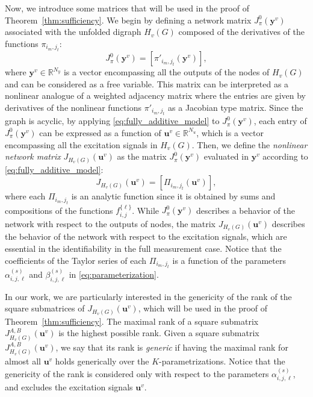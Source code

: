 \documentclass[letterpaper,10pt,journal]{IEEEtran}
\newcommand{\y}{\mathbf{y}}
\newcommand{\uu}{\mathbf{u}}
\newcommand{\R}{\mathbb R}
\begin{document}
Now, we introduce some matrices that will be used in the proof of Theorem~\ref{thm:sufficiency}. We begin by defining a network matrix $J_\pi^0(\y^v)$ associated with the unfolded digraph $H_v(G)$ composed of the derivatives of the functions $\pi_{i_m,j_t}$:
\begin{equation}\label{eq:matrix_J_0}
J_\pi^0(\y^v)=
[\pi'_{i_m,j_t}(\y^v)],
\end{equation}
where $\y^v\in\R^{N_y}$ is a vector encompassing all the outputs of the nodes of $H_v(G)$ and can be considered as a free variable. This matrix can be interpreted as a nonlinear analogue of a weighted adjacency matrix where the entries are given by derivatives of the nonlinear functions $\pi'_{i_m,j_t}$ as a Jacobian type matrix.
Since the graph is acyclic, by applying \eqref{eq:fully_additive_model} to $J_\pi^0(\y^v)$, each entry of $J_\pi^0(\y^v)$ can be expressed as a function of $\uu^v\in \R^{N_u}$, which is a vector encompassing all the excitation signals in $H_v(G)$. Then, we define the \emph{nonlinear network matrix} $J_{H_v(G)}(\uu^v)$ as the matrix $J_\pi^0(\y^v)$ evaluated in $\y^v$ according to \eqref{eq:fully_additive_model}:
\begin{equation}\label{eq:matrix_J_G}
J_{H_v(G)}(\uu^v)=[\Pi_{i_m,j_t}(\uu^v)],    
\end{equation}
where each $\Pi_{i_m,j_t}$ is an analytic function since it is obtained by sums and compositions of the functions $f_{i,j}^{\{\ell\}}$. While $J_\pi^0(\y^v)$ describes a behavior of the network with respect to the outputs of nodes, the matrix $J_{H_v(G)}(\uu^v)$ describes the behavior of the network with respect to the excitation signals, which are essential in the identifiability in the full measurement case.
Notice that the coefficients of the Taylor series of each $\Pi_{i_m,j_t}$ is a function of the parameters  $\alpha_{i,j,\ell}^{(s)}$  and $\beta_{i,j,\ell}^{(s)}$ in \eqref{eq:parameterization}.



In our work, we are particularly interested in the genericity of the rank of the square submatrices of $J_{H_v(G)}(\uu^v)$, which will be used in the proof of Theorem~\ref{thm:sufficiency}. The maximal rank of a square submatrix $J_{H_v(G)}^{A,B}(\uu^v)$ is the highest possible rank. Given a square submatrix $J_{H_v(G)}^{A,B}(\uu^v)$, we say that its rank is \emph{generic} if having the maximal rank for almost all $\uu^v$ holds generically over the $K$-parametrizations. Notice that the genericity of the rank is considered only with respect to the parameters $\alpha_{i,j,\ell}^{(s)}$, and excludes the excitation signals $\uu^v$.
\end{document}
